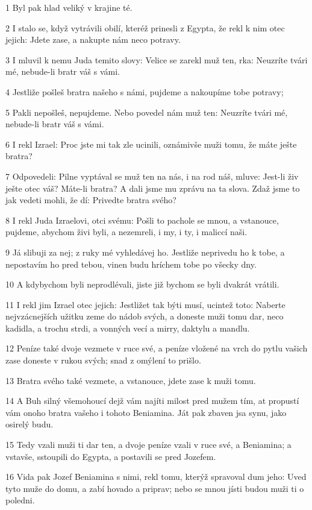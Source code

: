 \par 1 Byl pak hlad veliký v krajine té.
\par 2 I stalo se, když vytrávili obilí, kteréž prinesli z Egypta, že rekl k nim otec jejich: Jdete zase, a nakupte nám neco potravy.
\par 3 I mluvil k nemu Juda temito slovy: Velice se zarekl muž ten, rka: Neuzríte tvári mé, nebude-li bratr váš s vámi.
\par 4 Jestliže pošleš bratra našeho s námi, pujdeme a nakoupíme tobe potravy;
\par 5 Pakli nepošleš, nepujdeme. Nebo povedel nám muž ten: Neuzríte tvári mé, nebude-li bratr váš s vámi.
\par 6 I rekl Izrael: Proc jste mi tak zle ucinili, oznámivše muži tomu, že máte ješte bratra?
\par 7 Odpovedeli: Pilne vyptával se muž ten na nás, i na rod náš, mluve: Jest-li živ ješte otec váš? Máte-li bratra? A dali jsme mu zprávu na ta slova. Zdaž jsme to jak vedeti mohli, že dí: Privedte bratra svého?
\par 8 I rekl Juda Izraelovi, otci svému: Pošli to pachole se mnou, a vstanouce, pujdeme, abychom živi byli, a nezemreli, i my, i ty, i maliccí naši.
\par 9 Já slibuji za nej; z ruky mé vyhledávej ho. Jestliže neprivedu ho k tobe, a nepostavím ho pred tebou, vinen budu hríchem tobe po všecky dny.
\par 10 A kdybychom byli neprodlévali, jiste již bychom se byli dvakrát vrátili.
\par 11 I rekl jim Izrael otec jejich: Jestližet tak býti musí, ucintež toto: Naberte nejvzácnejších užitku zeme do nádob svých, a doneste muži tomu dar, neco kadidla, a trochu strdi, a vonných vecí a mirry, daktylu a mandlu.
\par 12 Peníze také dvoje vezmete v ruce své, a peníze vložené na vrch do pytlu vašich zase doneste v rukou svých; snad z omýlení to prišlo.
\par 13 Bratra svého také vezmete, a vstanouce, jdete zase k muži tomu.
\par 14 A Buh silný všemohoucí dejž vám najíti milost pred mužem tím, at propustí vám onoho bratra vašeho i tohoto Beniamina. Ját pak zbaven jsa synu, jako osirelý budu.
\par 15 Tedy vzali muži ti dar ten, a dvoje peníze vzali v ruce své, a Beniamina; a vstavše, sstoupili do Egypta, a postavili se pred Jozefem.
\par 16 Vida pak Jozef Beniamina s nimi, rekl tomu, kterýž spravoval dum jeho: Uved tyto muže do domu, a zabí hovado a priprav; nebo se mnou jísti budou muži ti o poledni.
